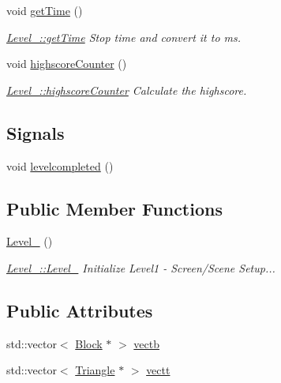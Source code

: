 \begin{DoxyCompactItemize}
void \hyperlink{class_level__2_a1803f60231c74fd237d37212a97e7eb6}{get\+Time} ()
\begin{DoxyCompactList}\small\item\em \hyperlink{class_level__2_a1803f60231c74fd237d37212a97e7eb6}{Level\+\_\+::get\+Time} Stop time and convert it to ms. \end{DoxyCompactList}\item 
void \hyperlink{class_level__2_a11fcf461308346ff34e2f6bac7f58476}{highscore\+Counter} ()
\begin{DoxyCompactList}\small\item\em \hyperlink{class_level__2_a11fcf461308346ff34e2f6bac7f58476}{Level\+\_\+::highscore\+Counter} Calculate the highscore. \end{DoxyCompactList}\end{DoxyCompactItemize}
\subsection*{Signals}
\begin{DoxyCompactItemize}
\item 
void \hyperlink{class_level__2_a29c182a385cb5c4036e41ff17a129e56}{levelcompleted} ()
\end{DoxyCompactItemize}
\subsection*{Public Member Functions}
\begin{DoxyCompactItemize}
\item 
\hyperlink{class_level__2_ad9e1165b1cf042f4d2c7337d25fc65e9}{Level\+\_} ()
\begin{DoxyCompactList}\small\item\em \hyperlink{class_level__2_ad9e1165b1cf042f4d2c7337d25fc65e9}{Level\+\_\+::\+Level\+\_} Initialize Level1 -\/ Screen/\+Scene Setup... \end{DoxyCompactList}\end{DoxyCompactItemize}
\subsection*{Public Attributes}
\begin{DoxyCompactItemize}
\item 
std\+::vector$<$ \hyperlink{class_block}{Block} $\ast$ $>$ \hyperlink{class_level__2_aaba33e2422ee9c077787c13912ddf05f}{vectb}
\item 
std\+::vector$<$ \hyperlink{class_triangle}{Triangle} $\ast$ $>$ \hyperlink{class_level__2_ad1367daaa96a8c50955eb735a3606dde}{vectt}
\end{DoxyCompactItemize}


